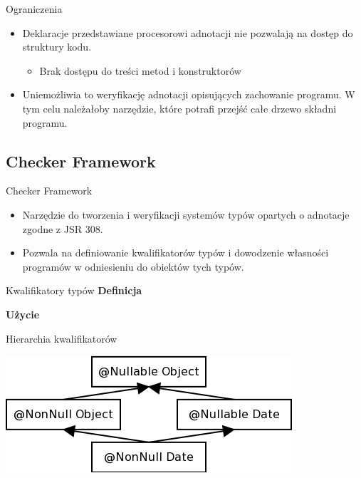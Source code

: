 \documentclass{beamer}
\begin{document}
\begin{frame}{Ograniczenia}
  \begin{itemize}
  \item Deklaracje przedstawiane procesorowi adnotacji 
    nie pozwalają na dostęp do struktury kodu.
    \begin{itemize}
    \item Brak dostępu do treści metod i konstruktorów
    \end{itemize}
  \item Uniemożliwia to weryfikację adnotacji opisujących zachowanie
    programu. W tym celu należałoby 
    narzędzie, które potrafi przejść całe drzewo składni programu.
  \end{itemize}
\end{frame}
    
\subsection{Checker Framework}

\begin{frame}{Checker Framework}
  \begin{itemize}
  \item Narzędzie do tworzenia i weryfikacji systemów typów 
    opartych o adnotacje zgodne z JSR 308.
  \item Pozwala na definiowanie kwalifikatorów typów i dowodzenie
    własności programów w odniesieniu do obiektów tych typów.
  \end{itemize}
\end{frame}

\begin{frame}{Kwalifikatory typów}
  \textbf{Definicja}
  
  \textbf{Użycie}
  
\end{frame}
  
\begin{frame}{Hierarchia kwalifikatorów}
  
  \begin{center}
    \includegraphics[scale=0.6]{img/nullness.png}
  \end{center}
\end{frame}
\end{document}
